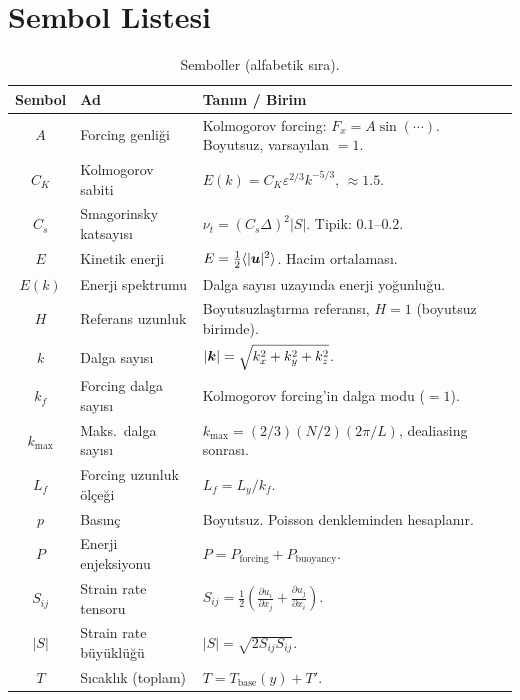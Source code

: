\section{Sembol Listesi}
\label{sec:semboller}

\begin{table}[H]
\centering
\caption{Semboller (alfabetik sıra).}
\label{tab:semboller}
\renewcommand{\arraystretch}{1.15}
\begin{tabular}{clp{8.5cm}}
\toprule
\textbf{Sembol} & \textbf{Ad} & \textbf{Tanım / Birim} \\
\midrule
$A$         & Forcing genliği     & Kolmogorov forcing: $F_x = A\sin(\cdots)$. Boyutsuz, varsayılan $=1$. \\
$C_K$       & Kolmogorov sabiti       & $E(k) = C_K \varepsilon^{2/3} k^{-5/3}$, $\approx 1.5$. \\
$C_s$       & Smagorinsky katsayısı & $\nu_t = (C_s \Delta)^2 |S|$. Tipik: $0.1$--$0.2$. \\
$E$         & Kinetik enerji          & $E = \frac{1}{2}\langle |\bm{u}|^2 \rangle$. Hacim ortalaması. \\
$E(k)$      & Enerji spektrumu        & Dalga sayısı uzayında enerji yoğunluğu. \\
$H$         & Referans uzunluk        & Boyutsuzlaştırma referansı, $H=1$ (boyutsuz birimde). \\
$k$         & Dalga sayısı          & $|\bm{k}| = \sqrt{k_x^2 + k_y^2 + k_z^2}$. \\
$k_f$       & Forcing dalga sayısı  & Kolmogorov forcing'in dalga modu ($=1$). \\
$k_{\max}$  & Maks.\ dalga sayısı  & $k_{\max} = (2/3)(N/2)(2\pi/L)$, dealiasing sonrası. \\
$L_f$       & Forcing uzunluk ölçeği & $L_f = L_y/k_f$. \\
$p$         & Basınç              & Boyutsuz. Poisson denkleminden hesaplanır. \\
$P$         & Enerji enjeksiyonu       & $P = P_{\text{forcing}} + P_{\text{buoyancy}}$. \\
$S_{ij}$    & Strain rate tensoru      & $S_{ij} = \frac{1}{2}\left(\frac{\partial u_i}{\partial x_j} + \frac{\partial u_j}{\partial x_i}\right)$. \\
$|S|$       & Strain rate büyüklüğü & $|S| = \sqrt{2 S_{ij} S_{ij}}$. \\
$T$         & Sıcaklık (toplam)   & $T = T_{\text{base}}(y) + T'$. \\

\end{tabular}
\end{table}
